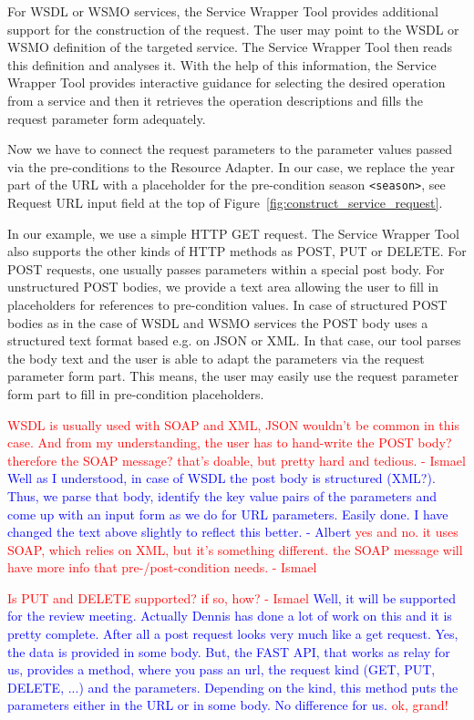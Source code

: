 \documentclass{fast_latex}
\begin{document}
For WSDL or WSMO services, the Service Wrapper Tool provides additional support for the construction of the request. The user may point to the WSDL or WSMO definition of the targeted service. The Service Wrapper Tool then reads this definition and analyses it. With the help of this information, the Service Wrapper Tool provides interactive guidance for selecting the desired operation from a service and then it retrieves the operation descriptions and fills the request parameter form adequately.

Now we have to connect the request parameters to the parameter values passed via the pre-conditions to the Resource Adapter. In our case, we replace the year part of the URL with a placeholder for the pre-condition season \verb|<season>|, see Request URL input field at the top of Figure~\ref{fig:construct_service_request}.  

In our example, we use a simple HTTP GET request. The Service Wrapper Tool also supports the other kinds of HTTP methods as POST, PUT or DELETE. For POST requests, one usually passes parameters within a special post body. For unstructured POST bodies, we provide a text area allowing the user to fill in placeholders for references to pre-condition values. In case of structured POST bodies as in the case of WSDL and WSMO services the POST body uses a structured text format based e.g. on JSON or XML. In that case, our tool parses the body text and the user is able to adapt the parameters via the request parameter form part. This means, the user may easily use the request parameter form part to fill in pre-condition placeholders.

\textcolor{red}{WSDL is usually used with SOAP and XML, JSON wouldn't be common in this case. And from my understanding, the user has to hand-write the POST body? therefore the SOAP message? that's doable, but pretty hard and tedious. - Ismael}
\textcolor{blue}{Well as I understood, in case of WSDL the post body is structured (XML?). Thus, we parse that body, identify the key value pairs of the parameters and come up with an input form as we do for URL parameters. Easily done. 
I have changed the text above slightly to reflect this better. - Albert}
\textcolor{red}{yes and no. it uses SOAP, which relies on XML, but it's something different. the SOAP message will have more info that pre-/post-condition needs. - Ismael}


\textcolor{red}{Is PUT and DELETE supported? if so, how? - Ismael}
\textcolor{blue}{Well, it will be supported for the review meeting. Actually Dennis has done a lot of work on this and it is pretty complete. 
After all a post request looks very much like a get request. Yes, the data is provided in some body. But, the FAST API, that works as relay for us, provides a method, where you pass an url, the request kind (GET, PUT, DELETE, ...) and the parameters. Depending on the kind, this method puts the parameters either in the URL or in some body. No difference for us.}
\textcolor{red}{ok, grand!}
\end{document}
